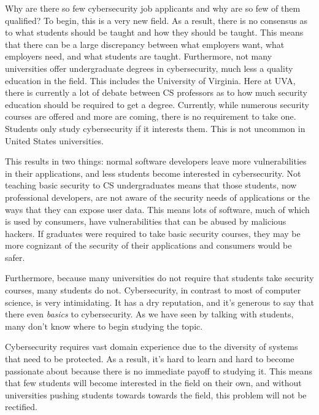\documentclass[openright]{report}
\begin{document}
\par Why are there so few cybersecurity job applicants and why are so few of them qualified? To begin, this is a very new field. As a result, there is no consensus as to what students should be taught and how they should be taught\cite{why_no_cyber_classes}. This means that there can be a large discrepancy between what employers want, what employers need, and what students are taught. Furthermore, not many universities offer undergraduate degrees in cybersecurity, much less a quality education in the field. This includes the University of Virginia. Here at UVA, there is currently a lot of debate between CS professors as to how much security education should be required to get a degree. Currently, while numerous security courses are offered and more are coming, there is no requirement to take one\cite{comsci_handbook}. Students only study cybersecurity if it interests them. This is not uncommon in United States universities.

\par This results in two things: normal software developers leave more vulnerabilities in their applications, and less students become interested in cybersecurity. Not teaching basic security to CS undergraduates means that those students, now professional developers, are not aware of the security needs of applications or the ways that they can expose user data. This means lots of software, much of which is used by consumers, have vulnerabilities that can be abused by malicious hackers. If graduates were required to take basic security courses, they may be more cognizant of the security of their applications and consumers would be safer.

\par Furthermore, because many universities do not require that students take security courses, many students do not. Cybersecurity, in contrast to most of computer science, is very intimidating. It has a dry reputation, and it's generous to say that there even \textit{basics} to cybersecurity. As we have seen by talking with students, many don't know where to begin studying the topic. 

\par Cybersecurity requires vast domain experience due to the diversity of systems that need to be protected. As a result, it's hard to learn and hard to become passionate about because there is no immediate payoff to studying it. This means that few students will become interested in the field on their own, and without universities pushing students towards towards the field, this problem will not be rectified.
\end{document}
